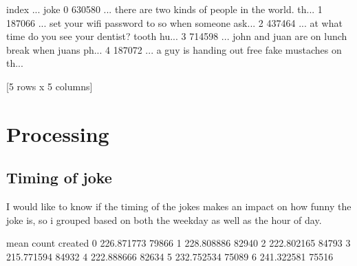 \documentclass[letterpaper,10pt,english]{jupyterBook}
\begin{document}
\begin{sphinxVerbatim}[commandchars=\\\{\}]
    index  ...                                               joke
0  630580  ...  there are two kinds of people in the world. th...
1  187066  ...  set your wifi password to  so when someone ask...
2  437464  ...  at what time do you see your dentist? tooth hu...
3  714598  ...  john and juan are on lunch break when juans ph...
4  187072  ...  a guy is handing out free fake mustaches on th...

[5 rows x 5 columns]
\end{sphinxVerbatim}


\section{Processing}
\label{\detokenize{c7_case_studies/Jokes:processing}}

\subsection{Timing of joke}
\label{\detokenize{c7_case_studies/Jokes:timing-of-joke}}
\sphinxAtStartPar
I would like to know if the timing of the jokes makes an impact on how funny the joke is, so i grouped based on both the weekday as well as the hour of day.

\begin{sphinxVerbatim}[commandchars=\\\{\}]
  \PYG{p}{[} \PYG{p}{]}
\end{sphinxVerbatim}

\begin{sphinxVerbatim}[commandchars=\\\{\}]
               mean  count
created                   
0        226.871773  79866
1        228.808886  82940
2        222.802165  84793
3        215.771594  84932
4        222.888666  82634
5        232.752534  75089
6        241.322581  75516
\end{sphinxVerbatim}
\end{document}
